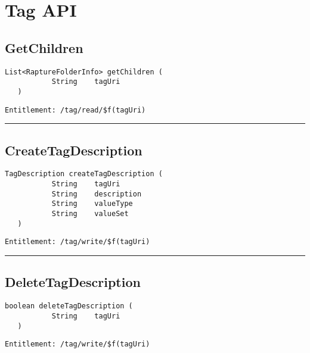 \chapter{Tag API}

\section{GetChildren}
\label{Api:GetChildren}
\begin{lstlisting}[style=nonumbers]
   List<RaptureFolderInfo> getChildren (
           String    tagUri
   )
\end{lstlisting}
\begin{Verbatim}[formatcom=\color{Maroon}]
  Entitlement: /tag/read/$f(tagUri)
\end{Verbatim}



\rule{12cm}{2pt}
\section{CreateTagDescription}
\label{Api:CreateTagDescription}
\begin{lstlisting}[style=nonumbers]
   TagDescription createTagDescription (
           String    tagUri
           String    description
           String    valueType
           String    valueSet
   )
\end{lstlisting}
\begin{Verbatim}[formatcom=\color{Maroon}]
  Entitlement: /tag/write/$f(tagUri)
\end{Verbatim}



\rule{12cm}{2pt}
\section{DeleteTagDescription}
\label{Api:DeleteTagDescription}
\begin{lstlisting}[style=nonumbers]
   boolean deleteTagDescription (
           String    tagUri
   )
\end{lstlisting}
\begin{Verbatim}[formatcom=\color{Maroon}]
  Entitlement: /tag/write/$f(tagUri)
\end{Verbatim}



